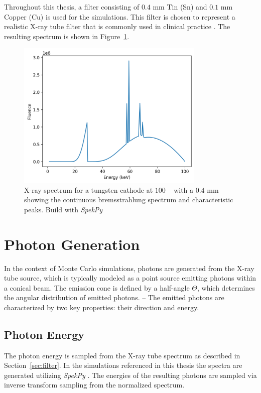 Throughout this thesis, a filter consisting of $0.4$ \si{\milli\meter} Tin (Sn)
and $0.1$ \si{\milli\meter} Copper (Cu) is used for the simulations. This filter
is chosen to represent a realistic X-ray tube filter that is commonly used in
clinical practice \cite{steidel2022dose}. The resulting spectrum is shown in
Figure~\ref{fig:spectrum100kvp_with_filter}.

\begin{figure}[H]
    \centering
    \includegraphics[width=0.8\textwidth]{Figures/spectrum_with_filter.png}
    \caption{X-ray spectrum for a tungsten cathode at $100$ \si{\kilo\voltpeak}
    with a $0.4$ \si{\milli\meter} showing the continuous bremsstrahlung
    spectrum and characteristic peaks. Build with \emph{SpekPy} \cite{spekpy}}
    \label{fig:spectrum100kvp_with_filter}
\end{figure}


\section{Photon Generation}

In the context of Monte Carlo simulations, photons are generated from the X-ray
tube source, which is typically modeled as a point source emitting photons
within a conical beam. The emission cone is defined by a half-angle $\Theta$,
which determines the angular distribution of emitted photons. -- The emitted photons are characterized by two key properties: their direction and
energy. 

\subsection{Photon Energy}
\label{sec:photon_energy}
The photon energy is sampled from the X-ray tube spectrum as described in
Section~\ref{sec:filter}. In the simulations referenced in this thesis the
spectra are generated utilizing \emph{SpekPy} \cite{spekpy,
poludniowski2021spekpy}. The energies of the resulting photons are sampled via
inverse transform sampling from the normalized spectrum.

